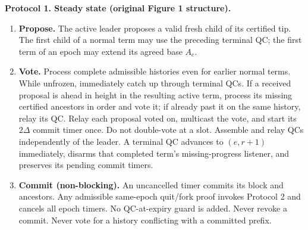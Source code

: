 \documentclass[10pt,a4paper]{article}
\newcommand{\chg}[1]{\textcolor{red!70!black}{#1}}
\begin{document}
\begin{mdframed}[linewidth=.6pt,innertopmargin=5pt,innerbottommargin=5pt]
\textbf{Protocol 1. Steady state (original Figure 1 structure).}
\begin{enumerate}[label=\textbf{\arabic*.},itemsep=3pt]
\item \textbf{Propose.} The active leader proposes a valid fresh child of
its certified tip. \chg{The first child of a normal term may use the preceding
terminal QC; the first term of an epoch may extend its agreed base $A_e$.}
\item \textbf{Vote.} Process complete admissible histories even for earlier
normal terms. \chg{While unfrozen, immediately catch up through terminal QCs.
If a received proposal is ahead in height in the resulting active term,
process its missing certified ancestors in order and vote it; if already
past it on the same history, relay its QC.} Relay each proposal voted on,
multicast the vote, and start its $2\Delta$ commit timer once. Do not double-vote
at a slot. Assemble and relay QCs independently of the leader.
\chg{A terminal QC advances to $(e,r+1)$ immediately, disarms that completed
term's missing-progress listener, and preserves its pending commit timers.}
\item \textbf{Commit (non-blocking).} An uncancelled timer commits its block
and ancestors. \chg{Any admissible same-epoch quit/fork proof invokes Protocol 2
and cancels all epoch timers.} No QC-at-expiry guard is added. Never revoke
a commit. Never vote for a history conflicting with a committed prefix.
\end{enumerate}
\end{mdframed}
\end{document}
